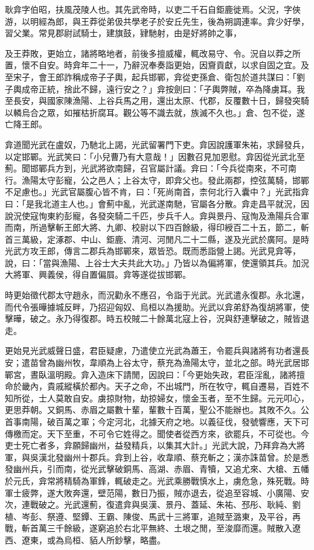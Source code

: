 
\begin{pinyinscope}
耿弇字伯昭，扶風茂陵人也。其先武帝時，以吏二千石自鉅鹿徙焉。父況，字俠游，以明經為郎，與王莽從弟伋共學老子於安丘先生，後為朔調連率。弇少好學，習父業。常見郡尉試騎士，建旗鼓，肄馳射，由是好將帥之事，

及王莽敗，更始立，諸將略地者，前後多擅威權，輒改易守、令。況自以莽之所置，懷不自安。時弇年二十一，乃辭況奉奏詣更始，因齎貢獻，以求自固之宜。及至宋子，會王郎詐稱成帝子子輿，起兵邯鄲，弇從吏孫倉、衛包於道共謀曰：「劉子輿成帝正統，捨此不歸，遠行安之？」弇按劍曰：「子輿弊賊，卒為降虜耳。我至長安，與國家陳漁陽、上谷兵馬之用，還出太原、代郡，反覆數十日，歸發突騎以轔烏合之眾，如摧枯折腐耳。觀公等不識去就，族滅不久也。」倉、包不從，遂亡降王郎。

弇道聞光武在盧奴，乃馳北上謁，光武留署門下吏。弇因說護軍朱祐，求歸發兵，以定邯鄲。光武笑曰：「小兒曹乃有大意哉！」因數召見加恩慰。弇因從光武北至薊。聞邯鄲兵方到，光武將欲南歸，召官屬計議。弇曰：「今兵從南來，不可南行。漁陽太守彭寵，公之邑人；上谷太守，即弇父也。發此兩郡，控弦萬騎，邯鄲不足慮也。」光武官屬腹心皆不肯，曰：「死尚南首，柰何北行入囊中？」光武指弇曰：「是我北道主人也。」會薊中亂，光武遂南馳，官屬各分散。弇走昌平就況，因說況使寇恂東約彭寵，各發突騎二千匹，步兵千人。弇與景丹、寇恂及漁陽兵合軍而南，所過擊斬王郎大將、九卿、校尉以下四百餘級，得印綬百二十五，節二，斬首三萬級，定涿郡、中山、鉅鹿、清河、河閒凡二十二縣，遂及光武於廣阿。是時光武方攻王郎，傳言二郡兵為邯鄲來，眾皆恐。既而悉詣營上謁。光武見弇等，說，曰：「當與漁陽、上谷士大夫共此大功。」乃皆以為偏將軍，使還領其兵。加況大將軍、興義侯，得自置偏屓。弇等遂從拔邯鄲。

時更始徵代郡太守趙永，而況勸永不應召，令詣于光武。光武遣永復郡。永北還，而代令張曄據城反畔，乃招迎匈奴、烏桓以為援助。光武以弇弟舒為復胡將軍，使擊曄，破之。永乃得復郡。時五校賊二十餘萬北寇上谷，況與舒連擊破之，賊皆退走。

更始見光武威聲日盛，君臣疑慮，乃遣使立光武為蕭王，令罷兵與諸將有功者還長安；遣苗曾為幽州牧，韋順為上谷太守，蔡充為漁陽太守，並北之部。時光武居邯鄲宮，晝臥溫明殿。弇入造床下請閒，因說曰：「今更始失政，君臣淫亂，諸將擅命於畿內，貴戚縱橫於都內。天子之命，不出城門，所在牧守，輒自遷易，百姓不知所從，士人莫敢自安。虜掠財物，劫掠婦女，懷金玉者，至不生歸。元元叩心，更思莽朝。又銅馬、赤眉之屬數十輩，輩數十百萬，聖公不能辦也。其敗不久。公首事南陽，破百萬之軍；今定河北，北據天府之地。以義征伐，發號響應，天下可傳檄而定。天下至重，不可令它姓得之。聞使者從西方來，欲罷兵，不可從也。今吏士死亡者多，弇願歸幽州，益發精兵，以集其大計。」光武大說，乃拜弇為大將軍，與吳漢北發幽州十郡兵。弇到上谷，收韋順、蔡充斬之；漢亦誅苗曾。於是悉發幽州兵，引而南，從光武擊破銅馬、高湖、赤眉、青犢，又追尤來、大槍、五幡於元氏，弇常將精騎為軍鋒，輒破走之。光武乘勝戰慎水上，虜危急，殊死戰。時軍士疲弊，遂大敗奔還，壁范陽，數日乃振，賊亦退去，從追至容城、小廣陽、安次，連戰破之。光武還薊，復遣弇與吳漢、景丹、蓋延、朱祐、邳彤、耿純、劉植、岑彭、祭遵、堅鐔、王霸、陳俊、馬武十三將軍，追賊至潞東，及平谷，再戰，斬首萬三千餘級，遂窮追於右北平無終、土垠之閒，至浚靡而還。賊散入遼西、遼東，或為烏桓、貊人所鈔擊，略盡。


\end{pinyinscope}
